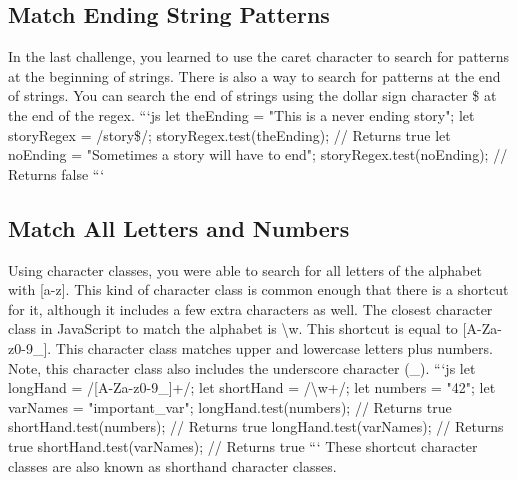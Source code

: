 \documentclass{article}%
\begin{document}
%
\subsection{Match Ending String Patterns}%
\label{subsec:MatchEndingStringPatterns}%
In the last challenge, you learned to use the caret character to search for patterns at the beginning of strings. There is also a way to search for patterns at the end of strings.\newline%
You can search the end of strings using the dollar sign character \$ at the end of the regex.\newline%
```js\newline%
let theEnding = "This is a never ending story";\newline%
let storyRegex = /story\$/;\newline%
storyRegex.test(theEnding);\newline%
// Returns true\newline%
let noEnding = "Sometimes a story will have to end";\newline%
storyRegex.test(noEnding);\newline%
// Returns false\newline%
```\newline%

%
\subsection{Match All Letters and Numbers}%
\label{subsec:MatchAllLettersandNumbers}%
Using character classes, you were able to search for all letters of the alphabet with {[}a{-}z{]}. This kind of character class is common enough that there is a shortcut for it, although it includes a few extra characters as well.\newline%
The closest character class in JavaScript to match the alphabet is \textbackslash{}w. This shortcut is equal to {[}A{-}Za{-}z0{-}9\_{]}. This character class matches upper and lowercase letters plus numbers. Note, this character class also includes the underscore character (\_).\newline%
```js\newline%
let longHand = /{[}A{-}Za{-}z0{-}9\_{]}+/;\newline%
let shortHand = /\textbackslash{}w+/;\newline%
let numbers = "42";\newline%
let varNames = "important\_var";\newline%
longHand.test(numbers); // Returns true\newline%
shortHand.test(numbers); // Returns true\newline%
longHand.test(varNames); // Returns true\newline%
shortHand.test(varNames); // Returns true\newline%
```\newline%
These shortcut character classes are also known as shorthand character classes.\newline%
\end{document}
